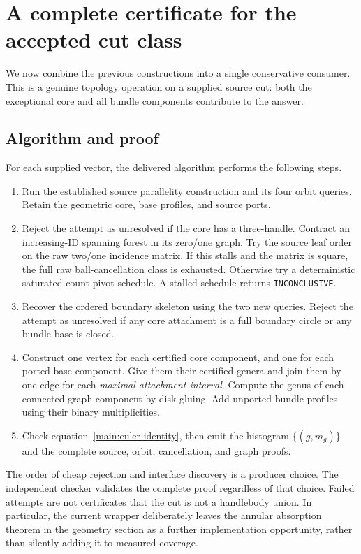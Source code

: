 \documentclass[11pt,a4paper]{article}
\theoremstyle{definition}
\newcommand{\code}[1]{\texttt{#1}}
\begin{document}



\section{A complete certificate for the accepted cut class}
\label{main:consumer}

We now combine the previous constructions into a single conservative consumer.
This is a genuine topology operation on a supplied source cut: both the
exceptional core and all bundle components contribute to the answer.

\subsection{Algorithm and proof}

For each supplied vector, the delivered algorithm performs the following steps.
\begin{enumerate}
\item Run the established source parallelity construction and its four orbit
queries.  Retain the geometric core, base profiles, and source ports.
\item Reject the attempt as unresolved if the core has a three-handle.
Contract an increasing-ID spanning forest in its zero/one graph.  Try the
source leaf order on the raw two/one incidence matrix.  If this stalls and
the matrix is square, the full raw ball-cancellation class is exhausted.
Otherwise try a deterministic saturated-count pivot schedule.  A stalled
schedule returns \code{INCONCLUSIVE}.
\item Recover the ordered boundary skeleton using the two new queries.
Reject the attempt as unresolved if any core attachment is a full boundary
circle or any bundle base is closed.
\item Construct one vertex for each certified core component, and one for
each ported base component.  Give them their certified genera and join them
by one edge for each \emph{maximal attachment interval}.  Compute the genus
of each connected graph component by disk gluing.  Add unported bundle
profiles using their binary multiplicities.
\item Check equation~\eqref{main:euler-identity}, then emit the histogram
$\{(g,m_g)\}$ and the complete source, orbit, cancellation, and graph proofs.
\end{enumerate}

The order of cheap rejection and interface discovery is a producer choice.
The independent checker validates the complete proof regardless of that
choice.  Failed attempts are not certificates that the cut is not a
handlebody union.  In particular, the current wrapper deliberately leaves
the annular absorption theorem in the geometry section as a further
implementation opportunity, rather than silently adding it to measured coverage.
\end{document}
